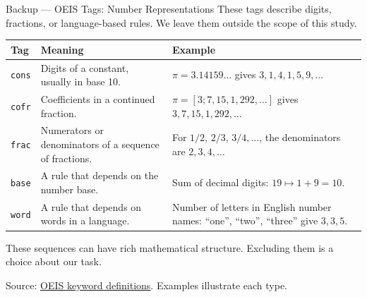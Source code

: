 \documentclass[aspectratio=169,10pt]{beamer}
\newcommand{\readout}[1]{\textcolor{readoutblue}{{\mdseries #1}}}
\begin{document}
\begin{frame}[label=backup-oeis-representation]{Backup --- OEIS Tags: Number Representations}
\small
\setlength{\parskip}{0pt}
\readout{These tags describe digits, fractions, or language-based rules. We leave them outside the scope of this study.}
\par\medskip
{\footnotesize
\renewcommand{\arraystretch}{1.35}
\begin{tabular}{@{}p{0.9cm}p{5.0cm}p{7.0cm}@{}}
\toprule
\textbf{Tag} & \textbf{Meaning} & \textbf{Example} \\
\midrule
\texttt{cons} & Digits of a constant, usually in base 10.
 & $\pi=3.14159\ldots$ gives $3,1,4,1,5,9,\ldots$ \\
\texttt{cofr} & Coefficients in a continued fraction.
 & $\pi=[3;7,15,1,292,\ldots]$ gives $3,7,15,1,292,\ldots$ \\
\texttt{frac} & Numerators or denominators of a sequence of fractions.
 & For $1/2,\,2/3,\,3/4,\ldots$, the denominators are $2,3,4,\ldots$ \\
\texttt{base} & A rule that depends on the number base.
 & Sum of decimal digits: $19\mapsto 1+9=10$. \\
\texttt{word} & A rule that depends on words in a language.
 & Number of letters in English number names: ``one'', ``two'', ``three'' give $3,3,5$. \\
\bottomrule
\end{tabular}}
\par\medskip
\readout{These sequences can have rich mathematical structure. Excluding them is a choice about our task.}
\par\smallskip
{\scriptsize Source: \href{https://oeis.org/wiki/Keywords}{OEIS keyword definitions}. Examples illustrate each type.}
\end{frame}
\end{document}
